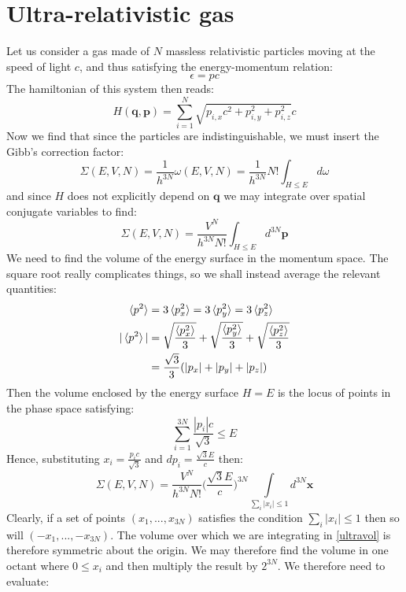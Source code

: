 \documentclass[a4paper,11pt,oneside]{book}
\begin{document}
\section{Ultra-relativistic gas}
Let us consider a gas made of $N$ massless relativistic particles moving at the speed of light $c$, and thus satisfying the energy-momentum relation:
\begin{equation}
    \epsilon=pc
\end{equation}
The hamiltonian of this system then reads:
\begin{equation}
    H(\textbf{q},\textbf{p}) = \sum_{i=1}^N \sqrt{p_{i,x}c^2 + p_{i,y}^2+p_{i,z}^2}c
\end{equation}
Now we find that since the particles are indistinguishable, we must insert the Gibb's correction factor:
\begin{equation}
    \Sigma(E,V,N)=\frac{1}{h^{3N}}\omega(E,V,N) = \frac{1}{h^{3N}}N! \int_{H\leq E} d\omega
\end{equation}
and since $H$ does not explicitly depend on $\textbf{q}$ we may integrate over spatial conjugate variables to find:
\begin{equation}
    \Sigma(E,V,N) = \frac{V^N}{h^{3N} N!} \int_{H \leq E} d^{3N} \textbf{p}
\end{equation}
We need to find the volume of the energy surface in the momentum space. The square root really complicates things, so we shall instead average the relevant quantities:
\begin{align}
    \braket{p^2} &= 3\braket{p_x^2} = 3\braket{p_y^2} = 3\braket{p_z^2}\\
    |\braket{p^2}| &= \sqrt{\frac{\braket{p_x^2}}{3}}+\sqrt{\frac{\braket{p_y^2}}{3}}+\sqrt{\frac{\braket{p_z^2}}{3}}\\
    &=\frac{\sqrt{3}}{3}(|p_x|+|p_y|+|p_z|)
\end{align}
Then the volume enclosed by the energy surface $H=E$ is the locus of points in the phase space satisfying:
\begin{equation}
    \sum_{i=1}^{3N} \frac{|p_i|c}{\sqrt{3}} \leq E
\end{equation}
Hence, substituting $x_i = \frac{p_ic}{\sqrt{3}}$ and $dp_i = \frac{\sqrt{3}E}{c}$ then:
\begin{equation}\label{ultravol}
    \Sigma(E,V,N) = \frac{V^N}{h^{3N} N!} \bigg(\frac{\sqrt{3}E}{c}\bigg)^{3N} \int \limits_{\sum_i |x_i|\leq 1} d^{3N}\textbf{x}
\end{equation}
Clearly, if a set of points $(x_1,...,x_{3N})$ satisfies the condition $\sum_i |x_i| \leq 1$ then so will $(-x_1,...,-x_{3N})$. The volume over which we are integrating in \eqref{ultravol} is therefore symmetric about the origin. We may therefore find the volume in one octant where $0\leq x_i$ and then multiply the result by $2^{3N}$. We therefore need to evaluate:
\end{document}
